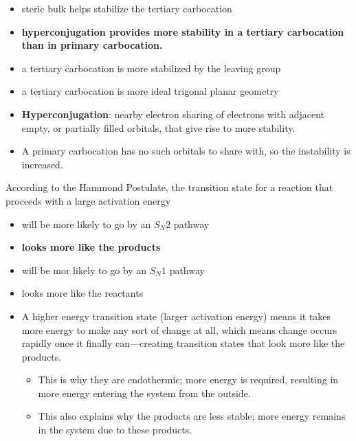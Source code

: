 \documentclass[12pt,a4paper]{article}
\begin{document}
\begin{enumerate}
{\begin{itemize}
        \item steric bulk helps stabilize the tertiary carbocation
        \item {\color{o-Sun}\textbf{hyperconjugation provides more stability in a tertiary carbocation than in primary carbocation.}}
        \item a tertiary carbocation is more stabilized by the leaving group
        \item a tertiary carbocation is more ideal trigonal planar geometry
    \end{itemize}}
        \begin{itemize}
            \item \textbf{Hyperconjugation}: nearby electron sharing of electrons with adjacent empty, or partially filled orbitals, that give rise to more stability.
            \item A primary carbocation has no such orbitals to share with, so the instability is increased.
        \end{itemize}
    {\color{G-Moon}\item According to the Hammond Postulate, the transition state for a reaction that proceeds with a large activation energy 
    \begin{itemize}
        \item will be more likely to go by an \(S_N2\) pathway
        \item {\color{o-Sun}\textbf{looks more like the products}}
        \item will be mor likely to go by an \(S_N1\) pathway
        \item looks more like the reactants
    \end{itemize}}
        \begin{itemize}
            \item A higher energy transition state (larger activation energy) means it takes more energy to make any sort of change at all, which means change occurs rapidly once it finally can---creating transition states that look more like the products.
                \begin{itemize}
                    \item This is why they are {\color{o-Sun}endothermic}; more energy is required, resulting in  more energy {\color{o-Sun}entering} the system from the outside.
                    \item This also explains why the products are less stable; more energy remains in the system due to these products.
                \end{itemize}

\end{itemize}
\end{enumerate}
\end{document}
